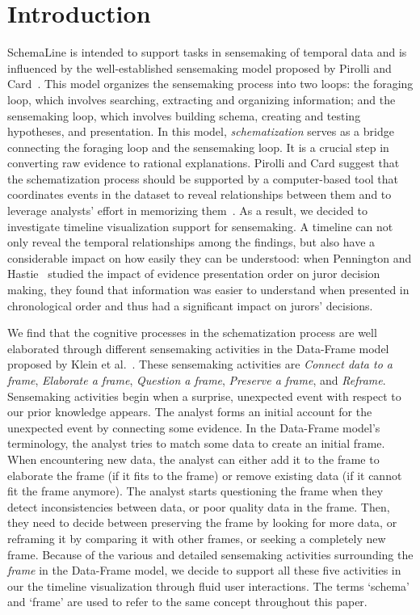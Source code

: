 \section{Introduction}
\label{sec:intro}


SchemaLine is intended to support tasks in sensemaking of temporal data and is influenced by the well-established sensemaking model proposed by Pirolli and Card~\cite{Pirolli2005}. This model organizes the sensemaking process into two loops: the foraging loop, which involves searching, extracting and organizing information; and the sensemaking loop, which involves building schema, creating and testing hypotheses, and presentation. In this model, \emph{schematization} serves as a bridge connecting the foraging loop and the sensemaking loop. It is a crucial step in converting raw evidence to rational explanations. Pirolli and Card suggest that the schematization process should be supported by a computer-based tool that coordinates events in the dataset to reveal relationships between them and to leverage analysts' effort in memorizing them~\cite{Pirolli2005}. As a result, we decided to investigate timeline visualization support for sensemaking. A timeline can not only reveal the temporal relationships among the findings, but also have a considerable impact on how easily they can be understood: when Pennington and Hastie~\cite{Pennington1991} studied the impact of evidence presentation order on juror decision making, they found that information was easier to understand when presented in chronological order and thus had a significant impact on jurors' decisions. 

We find that the cognitive processes in the schematization process are well elaborated through different sensemaking activities in the Data-Frame model proposed by Klein et al.~\cite{Klein2003}. These sensemaking activities are \emph{Connect data to a frame}, \emph{Elaborate a frame}, \emph{Question a frame}, \emph{Preserve a frame}, and \emph{Reframe}. Sensemaking activities begin when a surprise, unexpected event with respect to our prior knowledge appears. The analyst forms an initial account for the unexpected event by connecting some evidence. In the Data-Frame model's terminology, the analyst tries to match some data to create an initial frame. When encountering new data, the analyst can either add it to the frame to elaborate the frame (if it fits to the frame) or remove existing data (if it cannot fit the frame anymore). The analyst starts questioning the frame when they detect inconsistencies between data, or poor quality data in the frame. Then, they need to decide between preserving the frame by looking for more data, or reframing it by comparing it with other frames, or seeking a completely new frame. Because of the various and detailed sensemaking activities surrounding the \textit{frame} in the Data-Frame model, we decide to support all these five activities in our the timeline visualization through fluid user interactions. The terms `schema' and `frame' are used to refer to the same concept throughout this paper.


